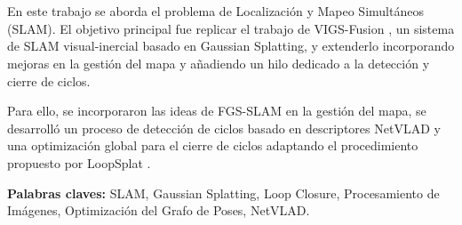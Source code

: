 \chapter*{\runtitulo}

\noindent 
En este trabajo se aborda el problema de Localización y Mapeo Simultáneos (SLAM). El objetivo principal fue replicar el trabajo de VIGS-Fusion \cite{ndoye2025vigs}, un sistema de SLAM visual-inercial basado en Gaussian Splatting, y extenderlo incorporando mejoras en la gestión del mapa y añadiendo un hilo dedicado a la detección y cierre de ciclos. 

Para ello, se incorporaron las ideas de FGS-SLAM \cite{xu2025fgsslamfourierbasedgaussiansplatting} en la gestión del mapa, se desarrolló un proceso de detección de ciclos basado en descriptores NetVLAD \cite{arandjelović2016netvladcnnarchitectureweakly} y una optimización global para el cierre de ciclos adaptando el procedimiento propuesto por LoopSplat \cite{zhu2025_loopsplat}.

\bigskip

\noindent\textbf{Palabras claves:} SLAM, Gaussian Splatting, Loop Closure, Procesamiento de Imágenes, Optimización del Grafo de Poses, NetVLAD.